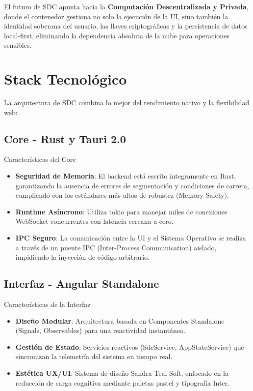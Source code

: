 El futuro de SDC apunta hacia la \textbf{Computación Descentralizada y Privada}, donde el contenedor gestiona no solo la ejecución de la UI, sino también la identidad soberana del usuario, las llaves criptográficas y la persistencia de datos local-first, eliminando la dependencia absoluta de la nube para operaciones sensibles.


\section{Stack Tecnológico}

La arquitectura de SDC combina lo mejor del rendimiento nativo y la flexibilidad web:

\subsection{Core - Rust y Tauri 2.0}

\begin{caja}{Características del Core}
\begin{itemize}
\item \textbf{Seguridad de Memoria}: El backend está escrito íntegramente en Rust, garantizando la ausencia de errores de segmentación y condiciones de carrera, cumpliendo con los estándares más altos de robustez (Memory Safety).
\item \textbf{Runtime Asíncrono}: Utiliza tokio para manejar miles de conexiones WebSocket concurrentes con latencia cercana a cero.
\item \textbf{IPC Seguro}: La comunicación entre la UI y el Sistema Operativo se realiza a través de un puente IPC (Inter-Process Communication) aislado, impidiendo la inyección de código arbitrario.
\end{itemize}
\end{caja}


\subsection{Interfaz - Angular Standalone}

\begin{caja}{Características de la Interfaz}
\begin{itemize}
\item \textbf{Diseño Modular}: Arquitectura basada en Componentes Standalone (Signals, Observables) para una reactividad instantánea.
\item \textbf{Gestión de Estado}: Servicios reactivos (SdcService, AppStateService) que sincronizan la telemetría del sistema en tiempo real.
\item \textbf{Estética UX/UI}: Sistema de diseño Sandra Teal Soft, enfocado en la reducción de carga cognitiva mediante paletas pastel y tipografía Inter.
\end{itemize}
\end{caja}

